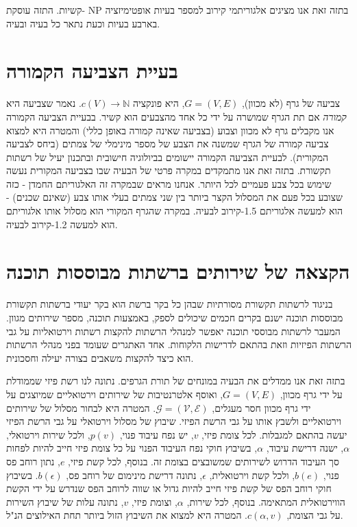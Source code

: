 \begin{hebrew}
בתזה זאת אנו מציגים אלגוריתמי קירוב למספר בעיות אופטימיזציה
$\text{NP}$%
-קשיות.
התזה עוסקת בארבע בעיות וכעת נתאר כל בעיה ובעיה.

\section*{\texthebrew{בעיית הצביעה הקמורה}}
צביעה של גרף (לא מכוון),
$G = (V, E)$,
 היא פונקציה
$c(V) \to \mathbb{N}$.
נאמר שצביעה היא
\emph{קמורה}
אם תת הגרף שמושרה על ידי כל אחד מהצבעים הוא קשיר.
בבעיית הצביעה הקמורה אנו מקבלים גרף לא מכוון וצבוע (בצביעה שאינה קמורה באופן כללי) והמטרה היא למצוא צביעה קמורה של הגרף שמשנה את הצבע של מספר מינימלי של צמתים (ביחס לצביעה המקורית).
לבעיית הצביעה הקמורה יישומים בביולוגיה חישובית ובתכנון יעיל של רשתות תקשורת.
בתזה זאת אנו מתמקדים במקרה פרטי של הבעיה שבו בצביעה המקורית נעשה שימוש בכל צבע פעמיים לכל היותר.
אנחנו מראים שבמקרה זה האלגוריתם החמדן - כזה שצובע בכל פעם את המסלול הקצר ביותר בין שני צמתים בעלי אותו צבע (שאינם שכנים) - הוא למעשה אלגוריתם 1.5-קירוב לבעיה.
במקרה שהגרף המקורי הוא מסלול אותו אלגוריתם הוא למעשה 1.2-קירוב לבעיה.


\section*{\texthebrew{הקצאה של שירותים ברשתות מבוססות תוכנה}}
בניגוד לרשתות תקשורת מסורתיות שבהן כל בקר ברשת הוא בקר יעודי ברשתות תקשורת מבוססות תוכנה ישנם בקרים חכמים שיכולים לספק, באמצעות תוכנה, מספר שירותים מגוון.
המעבר לרשתות מבוססי תוכנה יאפשר למנהלי הרשתות להקצות רשתות וירטואליות על גבי הרשתות הפיזיות וזאת בהתאם לדרישות הלקוחות.
אחד האתגרים שעומד בפני מנהלי הרשתות הוא כיצד להקצות משאבים בצורה יעילה וחסכונית.

בתזה זאת אנו ממדלים את הבעיה במונחים של תורת הגרפים.
נתונה לנו רשת פיזי שממודלת על ידי גרף מכוון,
$G=(V,E)$,
ואוסף אלטרנטיבות של שירותים וירטואליים שמיוצגים על ידי גרף מכוון חסר מעגלים,
$\mathcal{G} = (\mathcal{V}, \mathcal{E})$.
המטרה היא לבחור מסלול של שירותים וירטואליים ולשבץ אותו על גבי הרשת הפיזי.
שיבוץ של מסלול וירטואלי על גבי הרשת הפיזי יעשה בהתאם למגבלות.
לכל צומת פיזי,
$v$,
 יש נפח עיבוד פנוי,
$p(v)$,
ולכל שירות וירטואלי,
$\alpha$,
ישנה דרישת עיבוד,
$\alpha$,
בשיבוץ חוקי נפח העיבוד הפנוי על כל צומת פיזי חייב להיות לפחות סך העיבוד הדרוש לשירותים שמשובצים בצומת זה.
בנוסף, לכל קשת פיזי,
$e$,
נתון רוחב פס פנוי,
$b(e)$,
ולכל קשת וירטואלית,
$\epsilon$,
נתונה דרישת מינימום של רוחב פס,
$b(\epsilon)$.
בשיבוץ חוקי רוחב הפס של קשת פיזי חייב להיות גדול או שווה לרוחב הפס שנדרש על ידי הקשת הווירטואלית  המתאימה.
בנוסף, לכל שירות,
$\alpha$,
וצומת פיזי,
$v$,
נתונה עלות של שיבוץ השירות על גבי הצומת,
$c(\alpha, v)$.
המטרה היא למצוא את השיבוץ הזול ביותר תחת האילוצים הנ"ל.


\end{hebrew}
